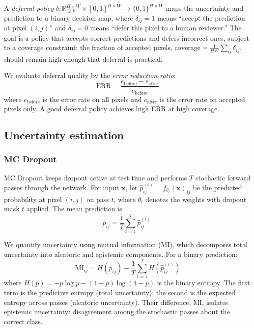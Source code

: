 A \emph{deferral policy} $\delta: \mathbb{R}_{\geq 0}^{H \times W} \times
[0,1]^{H \times W} \to \{0, 1\}^{H \times W}$ maps the uncertainty and
prediction to a binary decision map, where $\delta_{ij} = 1$ means ``accept
the prediction at pixel $(i,j)$'' and $\delta_{ij} = 0$ means ``defer this
pixel to a human reviewer.'' The goal is a policy that accepts correct
predictions and defers incorrect ones, subject to a coverage constraint: the
fraction of accepted pixels, $\text{coverage} = \frac{1}{HW}\sum_{ij}
\delta_{ij}$, should remain high enough that deferral is practical.

We evaluate deferral quality by the \emph{error reduction ratio}:
\begin{equation}
  \text{ERR} = \frac{e_{\text{before}} - e_{\text{after}}}{e_{\text{before}}}
  \label{eq:err}
\end{equation}
where $e_{\text{before}}$ is the error rate on all pixels and
$e_{\text{after}}$ is the error rate on accepted pixels only. A good deferral
policy achieves high ERR at high coverage.

\subsection{Uncertainty estimation}
\label{sec:uncertainty}

\subsubsection{MC Dropout}

MC Dropout \citep{gal2016dropout} keeps dropout active at test time and
performs $T$ stochastic forward passes through the network. For input
$\mathbf{x}$, let $\hat{p}_{ij}^{(t)} = f_{\theta_t}(\mathbf{x})_{ij}$ be
the predicted probability at pixel $(i,j)$ on pass $t$, where $\theta_t$
denotes the weights with dropout mask $t$ applied. The mean prediction is
\begin{equation}
  \bar{p}_{ij} = \frac{1}{T} \sum_{t=1}^{T} \hat{p}_{ij}^{(t)}.
  \label{eq:mc_mean}
\end{equation}

We quantify uncertainty using mutual information (MI), which decomposes total
uncertainty into aleatoric and epistemic components. For a binary prediction:
\begin{equation}
  \text{MI}_{ij} = H(\bar{p}_{ij}) - \frac{1}{T} \sum_{t=1}^{T} H(\hat{p}_{ij}^{(t)})
  \label{eq:mi}
\end{equation}
where $H(p) = -p \log p - (1-p) \log(1-p)$ is the binary entropy. The first
term is the predictive entropy (total uncertainty); the second is the expected
entropy across passes (aleatoric uncertainty). Their difference, MI, isolates
epistemic uncertainty: disagreement among the stochastic passes about the
correct class.

